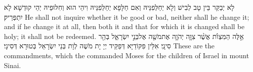 {לָא יְבַקַּר בֵּין טָב לְבִישׁ וְלָא יְחַלְּפִנֵּיהּ וְאִם חַלָּפָא יְחַלְּפִנֵּיהּ וִיהֵי הוּא וְחִלּוּפֵיהּ יְהֵי קוּדְשָׁא לָא יִתְפְּרֵיק׃}
{He shall not inquire whether it be good or bad, neither shall he change it; and if he change it at all, then both it and that for which it is changed shall be holy; it shall not be redeemed.}{}
{אֵ֣לֶּה הַמִּצְוֺ֗ת אֲשֶׁ֨ר צִוָּ֧ה יְהֹוָ֛ה אֶת\maqqaf מֹשֶׁ֖ה אֶל\maqqaf בְּנֵ֣י יִשְׂרָאֵ֑ל בְּהַ֖ר סִינָֽי׃}
{אִלֵּין פִּקּוֹדַיָּא דְּפַקֵּיד יְיָ יָת מֹשֶׁה לְוָת בְּנֵי יִשְׂרָאֵל בְּטוּרָא דְּסִינָי׃}
{These are the commandments, which the \lord\space commanded Moses for the children of Israel in mount Sinai.}{}

\newperek
